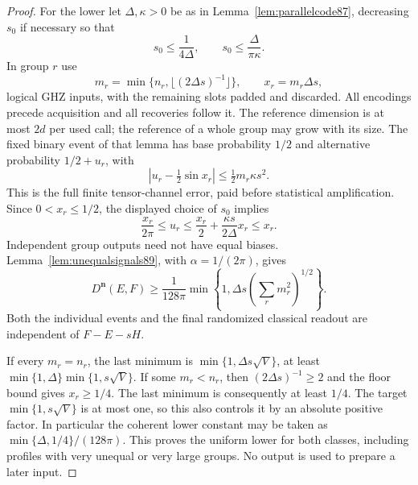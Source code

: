 \begin{proof}
For the lower let $\Delta,\kappa>0$ be as in
Lemma~\ref{lem:parallelcode87}, decreasing $s_0$ if necessary so that
\[
 s_0\le\frac1{4\Delta},\qquad
 s_0\le\frac{\Delta}{\pi\kappa}.
\]
In group $r$ use
\[
 m_r=\min\{n_r,\lfloor(2\Delta s)^{-1}\rfloor\},\qquad
 x_r=m_r\Delta s,
\]
logical GHZ inputs, with the remaining slots padded and discarded.
All encodings precede acquisition and all recoveries follow it.
The reference dimension is at most $2d$ per used call; the reference
of a whole group may grow with its size.
The fixed binary event of that lemma has base probability $1/2$ and
alternative probability $1/2+u_r$, with
\[
 \left|u_r-\tfrac12\sin x_r\right|
       \le\tfrac12m_r\kappa s^2.
\]
This is the full finite tensor-channel error, paid before statistical
amplification.  Since $0<x_r\le1/2$, the displayed choice of $s_0$
implies
\[
 \frac{x_r}{2\pi}\le u_r
 \le\frac{x_r}{2}+\frac{\kappa s}{2\Delta}x_r\le x_r.
\]
Independent group outputs need not have equal biases.
Lemma~\ref{lem:unequalsignals89}, with $\alpha=1/(2\pi)$, gives
\begin{equation}\label{eq:profilelowerfinite89}
 D^{\boldsymbol n}(E,F)\ge
 \frac1{128\pi}\min\left\{1,
                      \Delta s\left(\sum_r m_r^2\right)^{1/2}\right\}.
\end{equation}
Both the individual events and the final randomized classical
readout are independent of $F-E-sH$.

If every $m_r=n_r$, the last minimum is
$\min\{1,\Delta s\sqrt V\}$, at least
$\min\{1,\Delta\}\min\{1,s\sqrt V\}$.
If some $m_r<n_r$, then $(2\Delta s)^{-1}\ge2$ and the floor bound
gives $x_r\ge1/4$.  The last minimum is consequently at least $1/4$.
The target $\min\{1,s\sqrt V\}$ is at most one, so this also controls
it by an absolute positive factor.  In particular the coherent lower
constant may be taken as $\min\{\Delta,1/4\}/(128\pi)$.
This proves the uniform lower for both classes, including profiles with very unequal
or very large groups.  No output is used to prepare a later input.
\end{proof}

